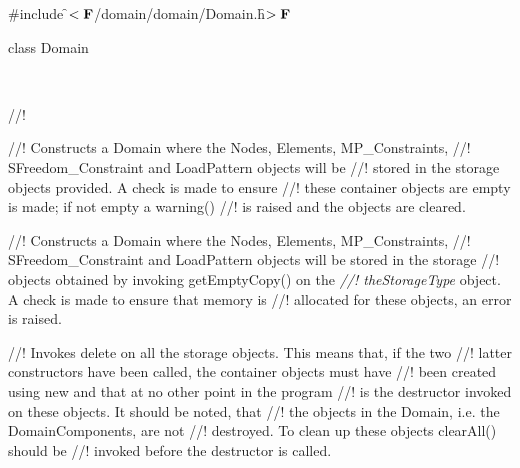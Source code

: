 
\indent \#include \f$<{\bf F}$/domain/domain/Domain.h\f$>{\bf F}$  

\indent class Domain  



\   

//!    


//! Constructs a Domain where the Nodes, Elements, MP\_Constraints,
//! SFreedom\_Constraint and LoadPattern objects will be
//! stored in the storage objects provided. A check is made to ensure
//! these container objects are empty is made; if not empty a warning()
//! is raised and the objects are cleared. 

//! Constructs a Domain where the Nodes, Elements, MP\_Constraints,
//! SFreedom\_Constraint and LoadPattern objects will be stored in the storage
//! objects obtained by invoking getEmptyCopy() on the {\em
//! theStorageType} object. A check is made to ensure that memory is
//! allocated for these objects, an error is raised.

//! Invokes delete on all the storage objects. This means that, if the two
//! latter constructors have been called, the container objects must have 
//! been created using \p new and that at no other point in the program
//! is the destructor invoked on these objects. It should be noted, that
//! the objects in the Domain, i.e. the DomainComponents, are not
//! destroyed. To clean up these objects clearAll() should be
//! invoked before the destructor is called. 


